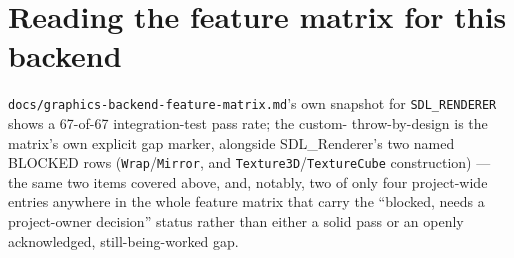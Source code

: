 \section{Reading the feature matrix for this backend}

\texttt{docs/graphics-backend-feature-matrix.md}'s own snapshot for
\texttt{SDL\_RENDERER} shows a 67-of-67 integration-test pass rate; the custom-
throw-by-design is the matrix's own explicit gap marker, alongside SDL\_Renderer's two named
BLOCKED rows (\texttt{Wrap}/\texttt{Mirror}, and \texttt{Texture3D}/\texttt{TextureCube}
construction) --- the same two items covered above, and, notably, two of only four
project-wide entries anywhere in the whole feature matrix that carry the ``blocked, needs a
project-owner decision'' status rather than either a solid pass or an openly acknowledged,
still-being-worked gap.
